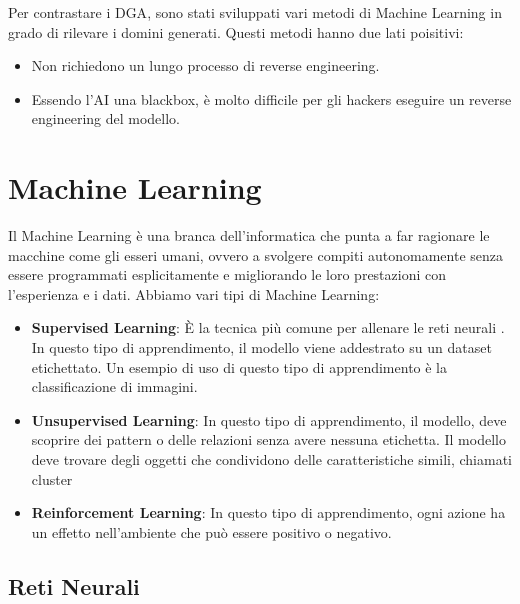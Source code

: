 \documentclass[12pt,a4paper,openright,twoside]{book}
\begin{document}
Per contrastare i \acrshort{DGA}, sono stati sviluppati
vari metodi di Machine Learning in grado di rilevare i domini generati.
Questi metodi hanno due lati poisitivi:
\begin{itemize}
    \item Non richiedono un lungo processo di reverse engineering.
    \item Essendo l'AI una blackbox, è molto difficile
    per gli hackers eseguire un reverse engineering del modello.
\end{itemize}

\section{Machine Learning}
Il Machine Learning è una branca dell'informatica che punta
a far ragionare le macchine come gli esseri umani, ovvero
a svolgere compiti autonomamente senza essere programmati
esplicitamente e migliorando le loro prestazioni con l'esperienza
e i dati.
Abbiamo vari tipi di Machine Learning:
\begin{itemize}
    \item \textbf{Supervised Learning}: È la tecnica più comune
    per allenare le reti neurali \cite{ayodele2010types}. In questo tipo di apprendimento,
    il modello viene addestrato su un dataset etichettato. Un esempio
    di uso di questo tipo di apprendimento è la classificazione
    di immagini.
    \item \textbf{Unsupervised Learning}: In questo tipo di apprendimento,
    il modello, deve scoprire dei pattern o delle relazioni
    senza avere nessuna etichetta. Il modello deve trovare
    degli oggetti che condividono delle caratteristiche simili, chiamati
    cluster
    \item \textbf{Reinforcement Learning}: In questo tipo di apprendimento,
    ogni azione ha un effetto nell'ambiente che può essere positivo
    o negativo.
\end{itemize}




\subsection{Reti Neurali}
\end{document}
